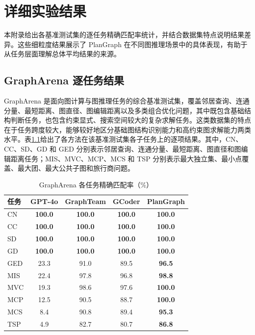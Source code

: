 \appendix

\chapter{详细实验结果}
\label{appendix:detailed_results}

本附录给出各基准测试集的逐任务精确匹配率统计，并结合数据集特点说明结果差异。这些细粒度结果展示了 PlanGraph 在不同图推理场景中的具体表现，有助于从任务层面理解总体平均结果的来源。

\section{GraphArena 逐任务结果}

GraphArena 是面向图计算与图推理任务的综合基准测试集，覆盖邻居查询、连通分量、最短距离、图直径、图编辑距离以及多类组合优化问题，其中既包含基础结构判断任务，也包含约束显式、搜索空间较大的复杂求解任务\cite{tang2025grapharena}。这类数据集的特点在于任务跨度较大，能够较好地区分基础图结构识别能力和高约束图求解能力两类水平。表\ref{tab:appendix_grapharena}给出了各方法在该基准测试集各子任务上的逐项结果。其中，CN、CC、SD、GD 和 GED 分别表示邻居查询、连通分量、最短距离、图直径和图编辑距离任务；MIS、MVC、MCP、MCS 和 TSP 分别表示最大独立集、最小点覆盖、最大团、最大公共子图和旅行商问题。

\begin{table}[H]
\centering
\caption{GraphArena 各任务精确匹配率（\%）}
\label{tab:appendix_grapharena}
\begin{tabular}{lcccc}
\toprule
任务 & GPT-4o & GraphTeam & GCoder & PlanGraph \\
\midrule
CN & \textbf{100.0} & \textbf{100.0} & \textbf{100.0} & \textbf{100.0} \\
CC & \textbf{100.0} & \textbf{100.0} & \textbf{100.0} & \textbf{100.0} \\
SD & \textbf{100.0} & \textbf{100.0} & \textbf{100.0} & \textbf{100.0} \\
GD & \textbf{100.0} & \textbf{100.0} & \textbf{100.0} & \textbf{100.0} \\
GED & 23.3 & 91.0 & 89.5 & \textbf{96.5} \\
MIS & 22.4 & 97.8 & 96.8 & \textbf{98.8} \\
MVC & 19.3 & 98.6 & 97.6 & \textbf{100.0} \\
MCP & 12.5 & 90.5 & 88.7 & \textbf{100.0} \\
MCS & 8.4 & 90.8 & 89.4 & \textbf{95.3} \\
TSP & 4.9 & 82.7 & 80.7 & \textbf{86.8} \\
\bottomrule
\end{tabular}
\end{table}

